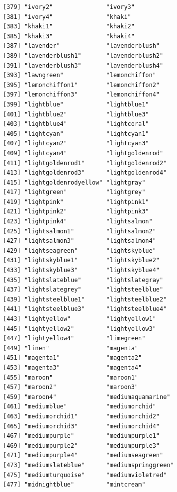 \documentclass[
  a4paper,
]{article}
\begin{document}
\begin{verbatim}
[379] "ivory2"               "ivory3"              
[381] "ivory4"               "khaki"               
[383] "khaki1"               "khaki2"              
[385] "khaki3"               "khaki4"              
[387] "lavender"             "lavenderblush"       
[389] "lavenderblush1"       "lavenderblush2"      
[391] "lavenderblush3"       "lavenderblush4"      
[393] "lawngreen"            "lemonchiffon"        
[395] "lemonchiffon1"        "lemonchiffon2"       
[397] "lemonchiffon3"        "lemonchiffon4"       
[399] "lightblue"            "lightblue1"          
[401] "lightblue2"           "lightblue3"          
[403] "lightblue4"           "lightcoral"          
[405] "lightcyan"            "lightcyan1"          
[407] "lightcyan2"           "lightcyan3"          
[409] "lightcyan4"           "lightgoldenrod"      
[411] "lightgoldenrod1"      "lightgoldenrod2"     
[413] "lightgoldenrod3"      "lightgoldenrod4"     
[415] "lightgoldenrodyellow" "lightgray"           
[417] "lightgreen"           "lightgrey"           
[419] "lightpink"            "lightpink1"          
[421] "lightpink2"           "lightpink3"          
[423] "lightpink4"           "lightsalmon"         
[425] "lightsalmon1"         "lightsalmon2"        
[427] "lightsalmon3"         "lightsalmon4"        
[429] "lightseagreen"        "lightskyblue"        
[431] "lightskyblue1"        "lightskyblue2"       
[433] "lightskyblue3"        "lightskyblue4"       
[435] "lightslateblue"       "lightslategray"      
[437] "lightslategrey"       "lightsteelblue"      
[439] "lightsteelblue1"      "lightsteelblue2"     
[441] "lightsteelblue3"      "lightsteelblue4"     
[443] "lightyellow"          "lightyellow1"        
[445] "lightyellow2"         "lightyellow3"        
[447] "lightyellow4"         "limegreen"           
[449] "linen"                "magenta"             
[451] "magenta1"             "magenta2"            
[453] "magenta3"             "magenta4"            
[455] "maroon"               "maroon1"             
[457] "maroon2"              "maroon3"             
[459] "maroon4"              "mediumaquamarine"    
[461] "mediumblue"           "mediumorchid"        
[463] "mediumorchid1"        "mediumorchid2"       
[465] "mediumorchid3"        "mediumorchid4"       
[467] "mediumpurple"         "mediumpurple1"       
[469] "mediumpurple2"        "mediumpurple3"       
[471] "mediumpurple4"        "mediumseagreen"      
[473] "mediumslateblue"      "mediumspringgreen"   
[475] "mediumturquoise"      "mediumvioletred"     
[477] "midnightblue"         "mintcream"           

\end{verbatim}
\end{document}

